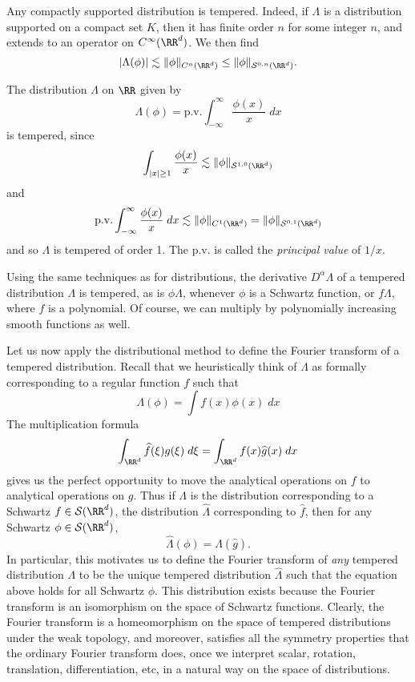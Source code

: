 \begin{example}
  Any compactly supported distribution is tempered. Indeed, if $\Lambda$ is a distribution supported on a compact set $K$, then it has finite order $n$ for some integer $n$, and extends to an operator on $C^\infty(\RR^d)$. We then find
  \[ |\Lambda(\phi)| \lesssim \| \phi \|_{C^n(\RR^d)} \leq \| \phi \|_{\mathcal{S}^{0,n}(\RR^d)}. \]
\end{example}

\begin{example}
  The distribution $\Lambda$ on $\RR$ given by
  \[ \Lambda(\phi) = \text{p.v.} \int_{-\infty}^\infty \frac{\phi(x)}{x}\; dx \]
  is tempered, since
  \[ \int_{|x| \geq 1} \frac{\phi(x)}{x} \lesssim \| \phi \|_{\mathcal{S}^{1,0}(\RR^d)} \]
  and
  \[ \text{p.v.} \int_{-\infty}^\infty \frac{\phi(x)}{x}\; dx \lesssim \| \phi \|_{C^1(\RR^d)} = \| \phi \|_{\mathcal{S}^{0,1}(\RR^d)} \]
  and so $\Lambda$ is tempered of order 1. The $\text{p.v.}$ is called the \emph{principal value} of $1/x$.
\end{example}

Using the same techniques as for distributions, the derivative $D^\alpha \Lambda$ of a tempered distribution $\Lambda$ is tempered, as is $\phi \Lambda$, whenever $\phi$ is a Schwartz function, or $f \Lambda$, where $f$ is a polynomial. Of course, we can multiply by polynomially increasing smooth functions as well.

Let us now apply the distributional method to define the Fourier transform of a tempered distribution. Recall that we heuristically think of $\Lambda$ as formally corresponding to a regular function $f$ such that
%
\[ \Lambda(\phi) = \int f(x) \phi(x)\; dx \]
%
The multiplication formula
%
\[ \int_{\RR^d} \widehat{f}(\xi) g(\xi)\; d\xi = \int_{\RR^d} f(x) \widehat{g}(x)\; dx \]
%
gives us the perfect opportunity to move the analytical operations on $f$ to analytical operations on $g$. Thus if $\Lambda$ is the distribution corresponding to a Schwartz $f \in \mathcal{S}(\RR^d)$, the distribution $\widehat{\Lambda}$ corresponding to $\widehat{f}$, then for any Schwartz $\phi \in \mathcal{S}(\RR^d)$,
%
\[ \widehat{\Lambda}(\phi) = \Lambda \left( \widehat{g} \right). \]
%
In particular, this motivates us to define the Fourier transform of \emph{any} tempered distribution $\Lambda$ to be the unique tempered distribution $\widehat{\Lambda}$ such that the equation above holds for all Schwartz $\phi$. This distribution exists because the Fourier transform is an isomorphism on the space of Schwartz functions. Clearly, the Fourier transform is a homeomorphism on the space of tempered distributions under the weak topology, and moreover, satisfies all the symmetry properties that the ordinary Fourier transform does, once we interpret scalar, rotation, translation, differentiation, etc, in a natural way on the space of distributions.

